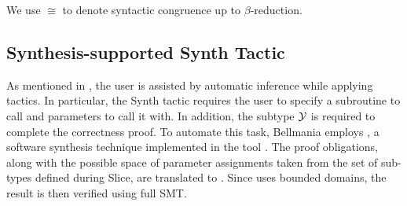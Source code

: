 We use $\cong$ to denote syntactic congruence up to $\beta$-reduction.

\begin{comment}
\Obligations Let $h=h_1/\cdots/h_r$, let $\overline\theta\!=\!\theta_{1..r}$ be $r$ fresh variables, and let
$f = \theta_{1..r} \mapsto (f_1\,\theta_1)::\T_1/\cdots/(f_r\,\theta_r)::\T_r$.
\begin{itemize}
  \item $\T_{1..r}$ are disjoint mappings.
  \item {\bf Either}\quad $h\,(f\,\overline\theta) = f\,\overline\theta$ \\{\bf or}\qquad
  $\begin{array}[t]{l} h\,\theta=\theta ~\limplies~ (f_i\,\theta :: \T_i)=\theta :: \T_i ~, \\
  \theta::\T_1~/~\cdots~/~\theta::\T_r=\theta\end{array}$
\end{itemize}

(We give two alternatives, as the first is usually easier to prove, but may hold in less cases)
\end{comment}


\newenvironment{tacticbox}[1]{\begin{center}
  \begin{tabular}{|@{~~~~}l@{~~~~}|}\hline
    \rule{0pt}{2.3ex}\underline{\sf \,#1\,}\\[.4em]$}
  {$\\[-1em] \\[.3ex] \hline \end{tabular} \end{center}}


\subsection{Synthesis-supported {\sf Synth} Tactic}
\label{tactics:synthesis}

As mentioned in , the user is assisted by automatic
inference while applying tactics. In particular, the {\sf Synth} tactic requires
the user to specify a subroutine to call and parameters to call it with.
In addition, the subtype $\mathcal{Y}$ is required to complete the correctness proof.
To automate this task, Bellmania employs {\cegis}, a software synthesis technique
implemented in the tool {\Sketch}. The proof obligations, along with the possible
space of parameter assignments taken from the set of sub-types defined during
{\sf Slice}, are translated to {\Sketch}. Since {\Sketch} uses bounded domains,
the result is then verified using full SMT.

